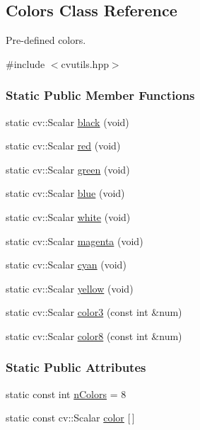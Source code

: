 \hypertarget{classColors}{\subsection{Colors Class Reference}
\label{classColors}
}


Pre-\/defined colors.  




{\ttfamily \#include $<$cvutils.\-hpp$>$}

\subsubsection*{Static Public Member Functions}
\begin{DoxyCompactItemize}
\item 
static cv\-::\-Scalar \hyperlink{classColors_aec5500a7bacaf540790954b251cb859e}{black} (void)
\item 
static cv\-::\-Scalar \hyperlink{classColors_ac9355f317c0aca8cb6c1329c996b52ff}{red} (void)
\item 
static cv\-::\-Scalar \hyperlink{classColors_a2e5a3b8a640c9a9d986a6f9edc60e14e}{green} (void)
\item 
static cv\-::\-Scalar \hyperlink{classColors_a35176ed2a7964fd7ccac8e4bb61c1a59}{blue} (void)
\item 
static cv\-::\-Scalar \hyperlink{classColors_ad923407109a41ab191b3c70756868245}{white} (void)
\item 
static cv\-::\-Scalar \hyperlink{classColors_acac58cf111796f98f7f851ec8dac3c56}{magenta} (void)
\item 
static cv\-::\-Scalar \hyperlink{classColors_aaeddb3283139623d18df416ec5cb7d4f}{cyan} (void)
\item 
static cv\-::\-Scalar \hyperlink{classColors_a803953241028654107321e46d9ae78d5}{yellow} (void)
\item 
static cv\-::\-Scalar \hyperlink{classColors_a44c783202f4a41371ff85e80df478109}{color3} (const int \&num)
\item 
static cv\-::\-Scalar \hyperlink{classColors_aac2bcf82724d40923e52543606b22628}{color8} (const int \&num)
\end{DoxyCompactItemize}
\subsubsection*{Static Public Attributes}
\begin{DoxyCompactItemize}
\item 
static const int \hyperlink{classColors_a5175069a56ae9ccfcb35b1688e1926ad}{n\-Colors} = 8
\item 
static const cv\-::\-Scalar \hyperlink{classColors_aa4ba92c3d309c4f93bf10cc0fe2e2d3b}{color} \mbox{[}$\,$\mbox{]}
\end{DoxyCompactItemize}


